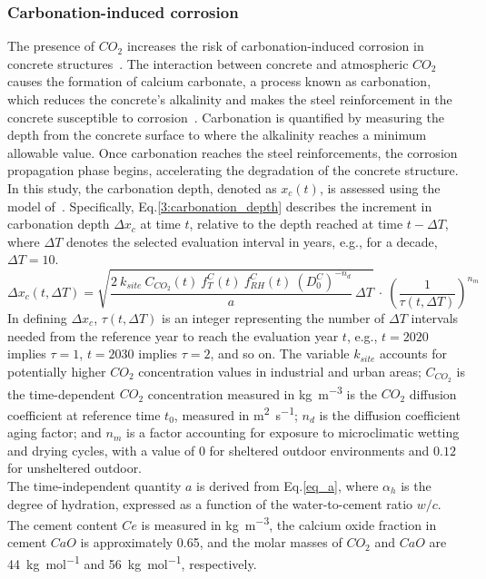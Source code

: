 \subsubsection{Carbonation-induced corrosion}\label{Carbonation_corrosion_Chpt}
The presence of $CO_2$ increases the risk of carbonation-induced corrosion in concrete structures~\cite{TALUKDAR_part1,TALUKDAR_part2}. 
The interaction between concrete and atmospheric $CO_2$ causes the formation of calcium carbonate, a process known as carbonation, which reduces the concrete's alkalinity and makes the steel reinforcement in the concrete susceptible to corrosion~\cite{GLASSER2008226}.
Carbonation is quantified by measuring the depth from the concrete surface to where the alkalinity reaches a minimum allowable value. 
Once carbonation reaches the steel reinforcements, the corrosion propagation phase begins, accelerating the degradation of the concrete structure.
In this study, the carbonation depth, denoted as $x_c(t)$, is assessed using the model of~\textcite{Carb_eq_STEWART,Carb_eq_BASTIDASARTEAGA}.
Specifically, Eq.\ref{3:carbonation_depth} describes the increment in carbonation depth $\Delta x_c$ at time $t$, relative to the depth reached at time $t-\Delta T$, where $\Delta T$ denotes the selected evaluation interval in years, e.g., for a decade, $\Delta T = 10$.
\begin{equation}
    \label{3:carbonation_depth}
    \Delta x_c(t, \Delta T) = \sqrt{\frac{2 \ k_{site} \ C_{CO_2}(t) \ f_T^C(t) \ f_{RH}^C(t) \ (D_0^C)^{-n_d}}{a} \ \Delta T} \ \cdot \ \left( \frac{1}{\tau (t, \Delta T)} \right)^{n_m} 
\end{equation}
In defining $\Delta x_c$, $\tau (t, \Delta T)$ is an integer representing the number of $\Delta T$ intervals needed from the reference year to reach the evaluation year $t$, e.g., $t = 2020$ implies $\tau = 1$, $t = 2030$ implies $\tau = 2$, and so on.
The variable $k_{site}$ accounts for potentially higher $CO_2$ concentration values in industrial and urban areas; $C_{CO_2}$ is the time-dependent $CO_2$ concentration measured in \si{\kilogram\per\cubic\meter} is the $CO_2$ diffusion coefficient at reference time $t_0$, measured in \si{\square\meter\per\second}; $n_d$ is the diffusion coefficient aging factor; and $n_m$ is a factor accounting for exposure to microclimatic wetting and drying cycles, with a value of $0$ for sheltered outdoor environments and $0.12$ for unsheltered outdoor. \\
The time-independent quantity $a$ is derived from Eq.\ref{eq_a}, where $\alpha_h$ is the degree of hydration, expressed as a function of the water-to-cement ratio $w / c$. The cement content $Ce$ is measured in \si{\kilogram\per\cubic\meter}, the calcium oxide fraction in cement $CaO$ is approximately 0.65, and the molar masses of $CO_2$ and $CaO$ are \SI{44}{\kilogram\per\mole} and \SI{56}{\kilogram\per\mole}, respectively.
